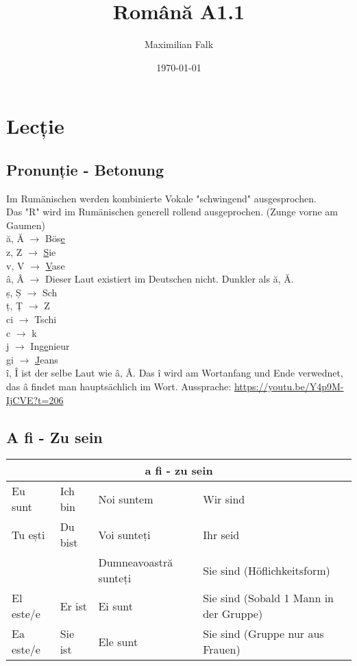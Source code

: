 \documentclass[11pt, oneside]{article}
\title{Română A1.1}
\author{Maximilian Falk}
\date{\today}
\begin{document}
\maketitle
\tableofcontents
%
%
\newpage
\section{Lecție}
%
\subsection{Pronunție - Betonung}
Im Rumänischen werden kombinierte Vokale "schwingend" ausgesprochen.\\
\newline
Das "R" wird im Rumänischen generell rollend ausgeprochen. (Zunge vorne am Gaumen)\\
\newline
ă, Ă $\rightarrow$ Bös\underline{e}\\
z, Z $\rightarrow$ \underline{S}ie\\
v, V $\rightarrow$ \underline{V}ase\\
â, Â $\rightarrow$ Dieser Laut existiert im Deutschen nicht. Dunkler als ă, Ă.\\
ș, Ș $\rightarrow$ Sch\\
ț, Ț $\rightarrow$ Z\\
ci $\rightarrow$ Tschi\\
c $\rightarrow$ k\\
j $\rightarrow$ In\underline{ge}nieur\\
gi $\rightarrow$ \underline{J}eans\\
\newline
î, Î ist der selbe Laut wie â, Â. Das î wird am Wortanfang und Ende verwednet, 
das â findet man hauptsächlich im Wort. Aussprache: \url{https://youtu.be/Y4p9M-IjCVE?t=206}
\subsection{A fi - Zu sein}
\begin{center}
    \begin{tabular}{ |p{2cm}|p{2cm}||l|l|  }
        \hline
        \multicolumn{4}{|c|}{a fi - zu sein} \\
        \hline
        \hline
        Eu sunt & Ich bin & Noi suntem & Wir sind\\
        \hline
        Tu ești & Du bist & Voi sunteți & Ihr seid\\
        & & Dumneavoastră sunteți & Sie sind (Höflichkeitsform)\\
        \hline
        El este/e & Er ist & Ei sunt & Sie sind (Sobald 1 Mann in der Gruppe)\\ 
        Ea este/e & Sie ist & Ele sunt & Sie sind (Gruppe nur aus Frauen)\\
        \hline
       \end{tabular}
\end{center}
%
\end{document}
